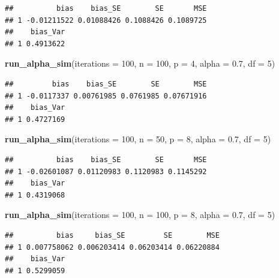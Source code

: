 \documentclass[
]{book}
\newenvironment{Shaded}{\begin{snugshade}}{\end{snugshade}}
\newcommand{\AttributeTok}[1]{\textcolor[rgb]{0.13,0.29,0.53}{#1}}
\newcommand{\DecValTok}[1]{\textcolor[rgb]{0.00,0.00,0.81}{#1}}
\newcommand{\FloatTok}[1]{\textcolor[rgb]{0.00,0.00,0.81}{#1}}
\newcommand{\FunctionTok}[1]{\textcolor[rgb]{0.13,0.29,0.53}{\textbf{#1}}}
\newcommand{\NormalTok}[1]{#1}
\begin{document}
\begin{verbatim}
##          bias    bias_SE        SE       MSE
## 1 -0.01211522 0.01088426 0.1088426 0.1089725
##    bias_Var
## 1 0.4913622
\end{verbatim}

\begin{Shaded}
\begin{Highlighting}[]
\FunctionTok{run\_alpha\_sim}\NormalTok{(}\AttributeTok{iterations =} \DecValTok{100}\NormalTok{, }\AttributeTok{n =} \DecValTok{100}\NormalTok{, }\AttributeTok{p =} \DecValTok{4}\NormalTok{, }\AttributeTok{alpha =} \FloatTok{0.7}\NormalTok{, }\AttributeTok{df =} \DecValTok{5}\NormalTok{)}
\end{Highlighting}
\end{Shaded}

\begin{verbatim}
##         bias    bias_SE        SE        MSE
## 1 -0.0117337 0.00761985 0.0761985 0.07671916
##    bias_Var
## 1 0.4727169
\end{verbatim}

\begin{Shaded}
\begin{Highlighting}[]
\FunctionTok{run\_alpha\_sim}\NormalTok{(}\AttributeTok{iterations =} \DecValTok{100}\NormalTok{, }\AttributeTok{n =} \DecValTok{50}\NormalTok{, }\AttributeTok{p =} \DecValTok{8}\NormalTok{, }\AttributeTok{alpha =} \FloatTok{0.7}\NormalTok{, }\AttributeTok{df =} \DecValTok{5}\NormalTok{)}
\end{Highlighting}
\end{Shaded}

\begin{verbatim}
##          bias    bias_SE        SE       MSE
## 1 -0.02601087 0.01120983 0.1120983 0.1145292
##    bias_Var
## 1 0.4319068
\end{verbatim}

\begin{Shaded}
\begin{Highlighting}[]
\FunctionTok{run\_alpha\_sim}\NormalTok{(}\AttributeTok{iterations =} \DecValTok{100}\NormalTok{, }\AttributeTok{n =} \DecValTok{100}\NormalTok{, }\AttributeTok{p =} \DecValTok{8}\NormalTok{, }\AttributeTok{alpha =} \FloatTok{0.7}\NormalTok{, }\AttributeTok{df =} \DecValTok{5}\NormalTok{)}
\end{Highlighting}
\end{Shaded}

\begin{verbatim}
##          bias     bias_SE         SE        MSE
## 1 0.007758062 0.006203414 0.06203414 0.06220884
##    bias_Var
## 1 0.5299059
\end{verbatim}
\end{document}
